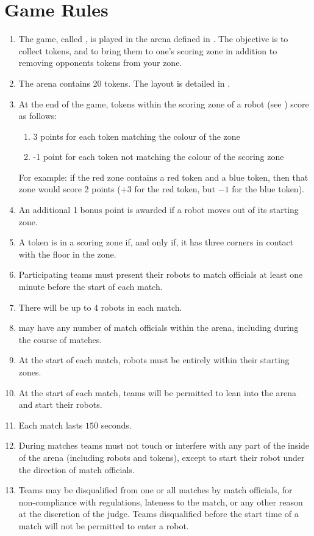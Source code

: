 \section{Game Rules}
\label{sec:rules}

\begin{enumerate}
  \item The game, called \emph{\gamename}, is played in the arena defined in
        . The objective is to collect tokens, and to bring
        them to one's scoring zone in addition to removing opponents tokens from
        your zone.
  \item The arena contains 20 tokens. The layout is detailed in
        .
  \item At the end of the game, tokens within the scoring zone of a robot (see
        ) score as follows:
    \begin{enumerate}
      \item 3 points for each token matching the colour of the zone
      \item -1 point for each token not matching the colour of the scoring zone
    \end{enumerate}
        For example: if the red zone contains a red token and a blue token, then
        that zone would score 2 points ($+3$ for the red token, but $-1$ for the
        blue token).
  \item An additional 1 bonus point is awarded if a robot moves out of its
        starting zone.
  \item \label{rules:token}A token is in a scoring zone if, and only if, it
        has three corners in contact with the floor in the zone.
  \item Participating teams must present their robots to match officials at
        least one minute before the start of each match.
  \item There will be up to 4 robots in each match.
  \item \org may have any number of match officials within the arena, including
        during the course of matches.
  \item At the start of each match, robots must be entirely within their
        starting zones.
  \item At the start of each match, teams will be permitted to lean into the
        arena and start their robots.
  \item Each match lasts $150$ seconds.
  \item During matches teams must not touch or interfere with any part of the
        inside of the arena (including robots and tokens), except to start their
        robot under the direction of match officials.
  \item Teams may be disqualified from one or all matches by match officials,
        for non-compliance with regulations, lateness to the match, or any other
        reason at the discretion of the judge. Teams disqualified before the
        start time of a match will not be permitted to enter a robot.
\end{enumerate}
